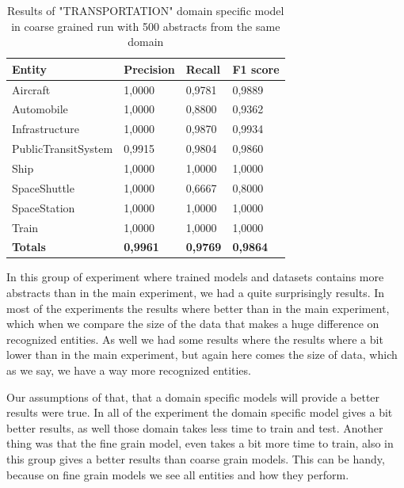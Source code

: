 \documentclass[thesis=M,english]{FITthesis}[2018/05/30]
\begin{document}
	\begin{table}[H]\centering
		\begin{tabular}{|l|l|l|l|}
			\hline {\textbf{Entity}} & {\textbf{Precision}} & {\textbf{Recall}} & {\textbf{F1 score}}\\\hline
				Aircraft & 1,0000 & 0,9781 & 0,9889\\
				Automobile & 1,0000 & 0,8800 & 0,9362\\				
				Infrastructure & 1,0000 & 0,9870 & 0,9934\\
				PublicTransitSystem & 0,9915 & 0,9804 & 0,9860\\
				Ship & 1,0000 & 1,0000 & 1,0000\\				
				SpaceShuttle & 1,0000 & 0,6667 & 0,8000\\
				SpaceStation & 1,0000 & 1,0000 & 1,0000\\
				Train & 1,0000 & 1,0000 & 1,0000\\\hline
				\textbf{Totals} & \textbf{0,9961} & \textbf{0,9769} & \textbf{0,9864}\\\hline
		\end{tabular}
		\caption{Results of "TRANSPORTATION" domain specific model in coarse grained run with 500 abstracts from the same domain \label{table:500TransportationDomainWithTransportationTop500Fine}}
	\end{table}	
		
	In this group of experiment where trained models and datasets contains more abstracts than in the main experiment, we had a quite surprisingly results. In most of the experiments the results where better than in the main experiment, which when we compare the size of the data that makes a huge difference on recognized entities. As well we had some results where the results where a bit lower than in the main experiment, but again here comes the size of data, which as we say, we have a way more recognized entities. 
	
	Our assumptions of that, that a domain specific models will provide a better results were true. In all of the experiment the domain specific model gives a bit better results, as well those domain takes less time to train and test. Another thing was that the fine grain model, even takes a bit more time to train, also in this group gives a better results than coarse grain models. This can be handy, because on fine grain models we see all entities and how they perform.
\end{document}
